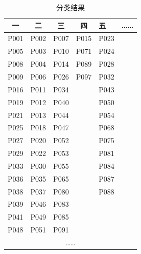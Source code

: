\begin{table}[h]
    \label{talbe041618}
    \caption{分类结果}
    \centering
    \begin{tabular}{@{}cccclc@{}}
        \toprule
        一    & 二    & 三    & 四                    & 五    & ……                   \\ \midrule
        P001 & P002 & P007 & P015                 & P023 &                      \\
        P005 & P003 & P010 & P071                 & P024 &                      \\
        P008 & P004 & P014 & P089                 & P028 &                      \\
        P009 & P006 & P026 & P097                 & P032 &                      \\
        P016 & P011 & P034 &                      & P043 &                      \\
        P019 & P012 & P040 &                      & P050 &                      \\
        P021 & P013 & P044 &                      & P054 &                      \\
        P025 & P018 & P047 &                      & P068 &                      \\
        P027 & P020 & P052 &                      & P075 &                      \\
        P029 & P022 & P053 &                      & P081 &                      \\
        P033 & P030 & P055 &                      & P084 &                      \\
        P036 & P035 & P065 &                      & P087 &                      \\
        P038 & P037 & P080 &                      & P088 &                      \\
        P039 & P046 & P083 &                      &      &                      \\
        P041 & P049 & P085 &                      &      &                      \\
        P048 & P051 & P091 & \multicolumn{1}{l}{} &      & \multicolumn{1}{l}{} \\
        \multicolumn{6}{c}{……}                                                  \\ \bottomrule
        \end{tabular}
\end{table}

